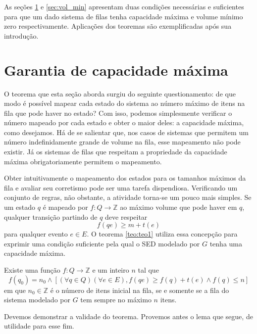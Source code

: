 As seções \ref{sec:capac_max} e \ref{sec:vol_min} apresentam duas condições necessárias e suficientes para que um dado sistema de filas tenha capacidade máxima e volume mínimo zero respectivamente. Aplicações dos teoremas são exemplificadas após sua introdução.

\section{Garantia de capacidade máxima}
\label{sec:capac_max}

O teorema que esta seção aborda surgiu do seguinte questionamento: de que modo é possível mapear cada estado do sistema ao número máximo de itens na fila que pode haver no estado? Com isso, podemos simplesmente verificar o número mapeado por cada estado e obter o maior deles: a capacidade máxima, como desejamos. Há de se salientar que, nos casos de sistemas que permitem um número indefinidamente grande de volume na fila, esse mapeamento não pode existir. Já os sistemas de filas que respeitam a propriedade da capacidade máxima obrigatoriamente permitem o mapeamento.

Obter intuitivamente o mapeamento dos estados para os tamanhos máximos da fila e avaliar seu corretismo pode ser uma tarefa dispendiosa. Verificando um conjunto de regras, não obstante, a atividade torna-se um pouco mais simples. Se um estado $q$ é mapeado por $f : Q \to \mathbb{Z}$ ao máximo volume que pode haver em $q$, qualquer transição partindo de $q$ deve respeitar $$f(qe) \geq m + t(e)$$ para qualquer evento $e \in E$. O teorema \ref{teo:teo1} utiliza essa concepção para exprimir uma condição suficiente pela qual o SED modelado por $G$ tenha uma capacidade máxima.

\begin{teo}
	\label{teo:teo1}
	Existe uma função $f : Q \to \mathbb{Z}$ e um inteiro $n$ tal que \begin{equation*}
	f(q_0) = n_0 \wedge [(\forall q \in Q)(\forall e \in E), f(qe) \geq f(q) + t(e) \wedge f(q) \leq n]
	\end{equation*} em que $n_0 \in \mathbb{Z}$ é o número de itens inicial na fila, se e somente se a fila do sistema modelado por $G$ tem sempre no máximo $n$ itens.
\end{teo}

Devemos demonstrar a validade do teorema. Provemos antes o lema que segue, de utilidade para esse fim.

